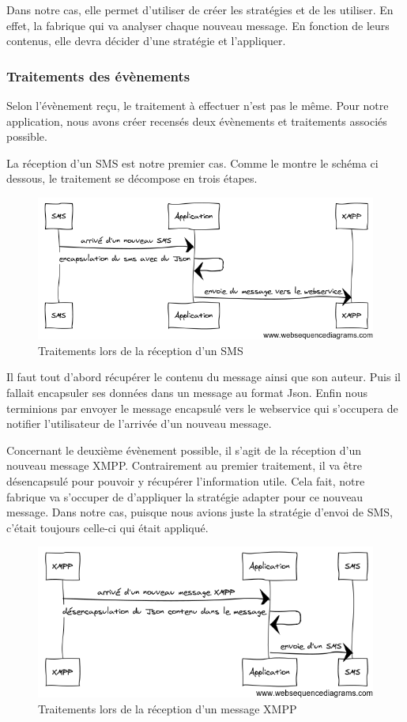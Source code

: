 Dans notre cas, elle permet d'utiliser de créer les stratégies et de les utiliser. En effet, la fabrique 
qui va analyser chaque nouveau message. En fonction de leurs contenus, elle devra décider d'une stratégie
et l'appliquer.
\\


\subsubsection{Traitements des évènements}

Selon l'évènement reçu, le traitement à effectuer n'est pas le même. Pour notre application, nous avons 
créer recensés deux évènements et traitements associés possible.

La réception d'un SMS est notre premier cas. Comme le montre le schéma ci dessous, le traitement se 
décompose en trois étapes. 

\begin{figure}[!h]
	\center
	\includegraphics[width=12cm]{img/encapsulation-sms.png}
	\caption{Traitements lors de la réception d'un SMS}
\end{figure}

Il faut tout d'abord récupérer le contenu du message ainsi que son auteur. Puis il fallait encapsuler 
ses données dans un message au format Json. Enfin nous terminions par envoyer le message encapsulé vers 
le webservice qui s'occupera de notifier l'utilisateur de l'arrivée d'un nouveau message.

Concernant le deuxième évènement possible, il s'agit de la réception d'un nouveau message XMPP. Contrairement
au premier traitement, il va être désencapsulé pour pouvoir y récupérer l'information utile. Cela fait, 
notre fabrique va s'occuper de d'appliquer la stratégie adapter pour ce nouveau message. Dans notre cas, 
puisque nous avions juste la stratégie d'envoi de SMS, c'était toujours celle-ci qui était appliqué.


\begin{figure}[!h]
	\center
	\includegraphics[width=12cm]{img/desencapsulation.png}
	\caption{Traitements lors de la réception d'un message XMPP}
\end{figure}
